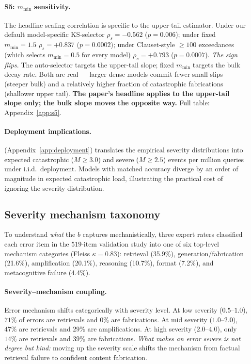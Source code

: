 \documentclass{article}
\newcommand{\sdi}{\ensuremath{b}}
\begin{document}
\paragraph{S5: $m_{\min}$ sensitivity.} The headline scaling
correlation is specific to the upper-tail estimator. Under our
default model-specific KS-selector $\rho_s = -0.562$ ($p = 0.006$);
under fixed $m_{\min} = 1.5$ $\rho_s = +0.837$ ($p = 0.0002$); under
Clauset-style $\geq 100$ exceedances (which selects $m_{\min} = 0.5$
for every model) $\rho_s = +0.793$ ($p = 0.0007$). \emph{The sign
flips.} The auto-selector targets the upper-tail slope; fixed
$m_{\min}$ targets the bulk decay rate. Both are real --- larger
dense models commit fewer small slips (steeper bulk) and a relatively
higher fraction of catastrophic fabrications (shallower upper tail).
\textbf{The paper's headline applies to the upper-tail slope only;
the bulk slope moves the opposite way.} Full table:
Appendix~\ref{app:s5}.

\paragraph{Deployment implications.}
 (Appendix~\ref{app:deployment}) translates the
empirical severity distributions into expected catastrophic
($M \geq 3.0$) and severe ($M \geq 2.5$) events per million queries
under i.i.d.\ deployment. Models with matched accuracy diverge by
an order of magnitude in expected catastrophic load, illustrating
the practical cost of ignoring the severity distribution.

\subsection{Severity mechanism taxonomy}\label{sec:taxonomy}

To understand \emph{what} the \sdi{} captures mechanistically, three
expert raters classified each error item in the $519$-item
validation study into one of six top-level mechanism categories
(Fleiss $\kappa = 0.83$): retrieval (35.9\%), generation/fabrication
(21.6\%), amplification (20.1\%), reasoning (10.7\%), format (7.2\%),
and metacognitive failure (4.4\%).

\paragraph{Severity--mechanism coupling.} Error mechanism shifts
categorically with severity level. At low severity ($0.5$--$1.0$),
\textbf{$71\%$} of errors are retrievals and \textbf{$0\%$} are
fabrications. At mid severity ($1.0$--$2.0$), $47\%$ are
retrievals and $29\%$ are amplifications. At high severity
($2.0$--$4.0$), only $14\%$ are retrievals and \textbf{$39\%$} are
fabrications. \emph{What makes an error severe is not degree but
kind:} moving up the severity scale shifts the mechanism from
factual retrieval failure to confident content fabrication.
\end{document}
